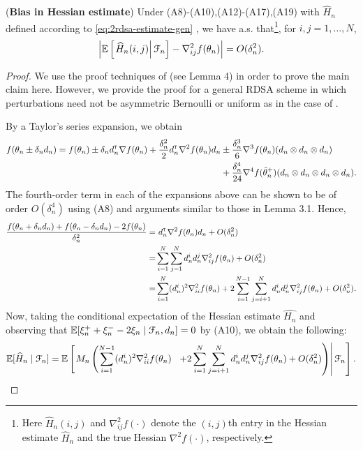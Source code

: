 \begin{lemma}(\textbf{Bias in Hessian estimate})
\label{lemma:2rdsa-gen-bias}
Under (A8)-(A10),(A12)-(A17),(A19) with $\widehat H_n$ defined according to \eqref{eq:2rdsa-estimate-gen} , we have a.s. that\footnote{Here $\widehat H_n(i,j)$ and $\nabla^2_{ij}f(\cdot)$ denote the $(i,j)$th entry in the Hessian estimate $\widehat H_n$ and the true Hessian $\nabla^2 f(\cdot)$, respectively.}, for $i,j = 1,\ldots,N$,
\begin{align}
\left|\mathbb{E}\left[
\left. \widehat H_n(i,j) \right| \mathcal{F}_n \right] - \nabla^2_{ij} f(\theta_n)\right| = O(\delta_n^2).
\end{align} 
\end{lemma}
\begin{proof}
We use the proof techniques of \cite{prashanth2015rdsa} (see Lemma 4) in order to prove the main claim here. However, we provide the proof for a general RDSA scheme in which perturbations need not be asymmetric Bernoulli or uniform as in the case of \cite{prashanth2015rdsa}.

By a Taylor's series expansion, we obtain
\begin{align*}
f(\theta_n \pm \delta_n d_n) = f(\theta_n) \pm \delta_n d_n^\mathsf{\scriptscriptstyle T} \nabla f(\theta_n) + \frac{\delta_n^2}{2} d_n^\mathsf{\scriptscriptstyle T} \nabla^2 f(\theta_n) d_n &\pm \frac{\delta_n^3}{6} \nabla^3 f(\theta_n) (d_n \otimes d_n \otimes d_n) \\
 & +  \frac{\delta_n^4}{24} \nabla^4 f(\tilde  \theta_n^+)(d_n \otimes d_n \otimes d_n \otimes d_n).
\end{align*}
The fourth-order term in each of the expansions above can be shown to be of order $O(\delta_n^4)$ using (A8) and arguments similar to those in Lemma 3.1. Hence,
\begin{align*}
\dfrac{f(\theta_n+\delta_n d_n) + f(\theta_n-\delta_n d_n) - 2 f(\theta_n)}{\delta_n^2}
 = &\,\, d_n^\mathsf{\scriptscriptstyle T} \nabla^2 f(\theta_n) d_n +  O(\delta_n^2)\\
= & \sum\limits_{i=1}^N\sum\limits_{j=1}^N d_n^i d_n^j \nabla^2_{ij} f(\theta_n) + O(\delta_n^2)\\
= & \sum\limits_{i=1}^N (d_n^i)^2 \nabla^2_{ii} f(\theta_n) + 2\sum\limits_{i=1}^{N-1}\sum\limits_{j=i+1}^N d_n^i d_n^j \nabla^2_{ij} f(\theta_n) + O(\delta_n^2).
\end{align*}
Now, taking the conditional expectation of the Hessian estimate $\widehat{H_n}$ and observing that $\mathbb{E}[\xi_n^+ + \xi_n^- - 2\xi_n \mid \mathcal{F}_n, d_n] = 0$ by (A10), we obtain the following:
\begin{align}
\mathbb{E}[\widehat H_n \mid \mathcal{F}_n] =  \mathbb{E}\left[\left. M_n \left(\sum\limits_{i=1}^{N-1} (d_n^i)^2 \nabla^2_{ii} f(\theta_n) \right.\right.\right.\left.\left.\left.+ 2\sum\limits_{i=1}^N\sum\limits_{j=i+1}^N d_n^i d_n^j \nabla^2_{ij} f(\theta_n) + O(\delta_n^2)\right)\right| \mathcal{F}_n\right]. \label{eq:h1}
\end{align}


\end{proof}
